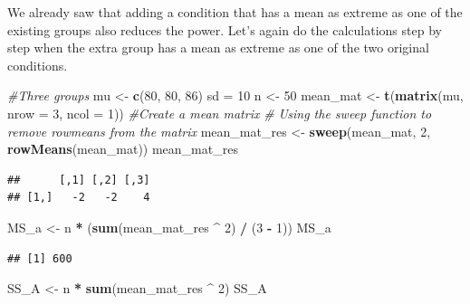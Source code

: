 \documentclass[]{book}
\newenvironment{Shaded}{\begin{snugshade}}{\end{snugshade}}
\newcommand{\CommentTok}[1]{\textcolor[rgb]{0.56,0.35,0.01}{\textit{#1}}}
\newcommand{\DataTypeTok}[1]{\textcolor[rgb]{0.13,0.29,0.53}{#1}}
\newcommand{\DecValTok}[1]{\textcolor[rgb]{0.00,0.00,0.81}{#1}}
\newcommand{\KeywordTok}[1]{\textcolor[rgb]{0.13,0.29,0.53}{\textbf{#1}}}
\newcommand{\NormalTok}[1]{#1}
\newcommand{\OperatorTok}[1]{\textcolor[rgb]{0.81,0.36,0.00}{\textbf{#1}}}
\newcommand{\StringTok}[1]{\textcolor[rgb]{0.31,0.60,0.02}{#1}}
\begin{document}
We already saw that adding a condition that has a mean as extreme as one of the existing groups also reduces the power. Let's again do the calculations step by step when the extra group has a mean as extreme as one of the two original conditions.

\begin{Shaded}
\begin{Highlighting}[]
\CommentTok{#Three groups}
\NormalTok{mu <-}\StringTok{ }\KeywordTok{c}\NormalTok{(}\DecValTok{80}\NormalTok{, }\DecValTok{80}\NormalTok{, }\DecValTok{86}\NormalTok{)}
\NormalTok{sd =}\StringTok{ }\DecValTok{10}
\NormalTok{n <-}\StringTok{ }\DecValTok{50}
\NormalTok{mean_mat <-}\StringTok{ }\KeywordTok{t}\NormalTok{(}\KeywordTok{matrix}\NormalTok{(mu,}
\DataTypeTok{nrow =} \DecValTok{3}\NormalTok{,}
\DataTypeTok{ncol =} \DecValTok{1}\NormalTok{)) }\CommentTok{#Create a mean matrix}
\CommentTok{# Using the sweep function to remove rowmeans from the matrix}
\NormalTok{mean_mat_res <-}\StringTok{ }\KeywordTok{sweep}\NormalTok{(mean_mat, }\DecValTok{2}\NormalTok{, }\KeywordTok{rowMeans}\NormalTok{(mean_mat))}
\NormalTok{mean_mat_res}
\end{Highlighting}
\end{Shaded}

\begin{verbatim}
##      [,1] [,2] [,3]
## [1,]   -2   -2    4
\end{verbatim}

\begin{Shaded}
\begin{Highlighting}[]
\NormalTok{MS_a <-}\StringTok{ }\NormalTok{n }\OperatorTok{*}\StringTok{ }\NormalTok{(}\KeywordTok{sum}\NormalTok{(mean_mat_res }\OperatorTok{^}\StringTok{ }\DecValTok{2}\NormalTok{) }\OperatorTok{/}\StringTok{ }\NormalTok{(}\DecValTok{3} \OperatorTok{-}\StringTok{ }\DecValTok{1}\NormalTok{))}
\NormalTok{MS_a}
\end{Highlighting}
\end{Shaded}

\begin{verbatim}
## [1] 600
\end{verbatim}

\begin{Shaded}
\begin{Highlighting}[]
\NormalTok{SS_A <-}\StringTok{ }\NormalTok{n }\OperatorTok{*}\StringTok{ }\KeywordTok{sum}\NormalTok{(mean_mat_res }\OperatorTok{^}\StringTok{ }\DecValTok{2}\NormalTok{)}
\NormalTok{SS_A}
\end{Highlighting}
\end{Shaded}
\end{document}
